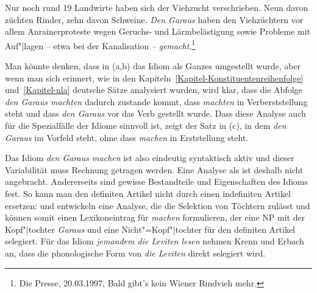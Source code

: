\ex Nur noch rund 19 Landwirte haben sich der Viehzucht verschrieben. Neun davon züchten Rinder, zehn davon Schweine. 
\emph{Den Garaus} haben den Viehzüchtern vor allem Anrainerproteste wegen Geruchs- und Lärmbelästigung sowie Probleme mit Auf"|lagen -- etwa bei der Kanalisation -- \emph{gemacht}.\footnote{
Die Presse, 20.03.1997, Bald gibt's kein Wiener Rindvieh mehr. %
}



\zl
Man könnte denken, dass in (a,b) das Idiom als Ganzes umgestellt wurde, aber wenn man sich
erinnert, wie in den Kapiteln~\ref{Kapitel-Konstituentenreihenfolge} und~\ref{Kapitel-nla} deutsche Sätze
analysiert wurden, wird klar, dass die Abfolge \emph{den Garaus machten} dadurch zustande kommt, dass
\emph{machten} in Verberststellung steht und dass \emph{den Garaus} vor das Verb gestellt wurde. Dass diese
Analyse auch für die Spezialfälle der Idiome sinnvoll ist, zeigt der Satz in (c), in dem
\emph{den Garaus} im Vorfeld steht, ohne dass \emph{machen} in Erststellung steht.

Das Idiom \emph{den Garaus machen} ist also eindeutig syntaktisch aktiv und dieser Variabilität muss
Rechnung getragen werden. Eine Analyse als \vnull ist deshalb nicht angebracht. Andererseits
sind gewisse Bestandteile und Eigenschaften des Idioms fest. So kann man \zb den definiten Artikel nicht durch einen
indefiniten Artikel ersetzen:
\z
\citet{Erbach92a} und \citet{KE94a} entwickeln eine Analyse, die die Selektion von Töchtern zulässt und können
somit einen Lexikoneintrag für \emph{machen} formulieren, der eine NP mit der Kopf"|tochter \emph{Garaus}
und eine Nicht"=Kopf"|tochter für den definiten Artikel selegiert. Für das Idiom \emph{jemandem die Leviten
lesen} nehmen Krenn und Erbach an, dass die phonologische Form von \emph{die Leviten} direkt selegiert
wird.

